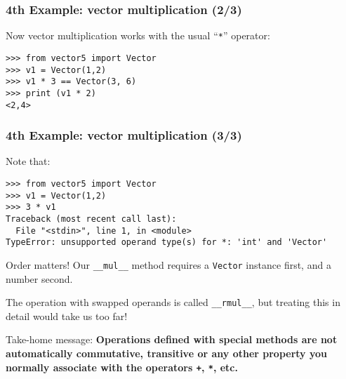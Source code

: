 \documentclass[english,serif,mathserif,xcolor=pdftex,dvipsnames,table]{beamer}
\begin{document}
\begin{frame}[fragile]
  \frametitle{4th Example: vector multiplication (2/3)}
  Now vector multiplication works with the usual ``\texttt{*}'' operator:
\begin{lstlisting}
>>> from vector5 import Vector
>>> v1 = Vector(1,2)
>>> v1 * 3 == Vector(3, 6)
>>> print (v1 * 2)
<2,4>
\end{lstlisting}
\end{frame}


\begin{frame}[fragile]
  \frametitle{4th Example: vector multiplication (3/3)}
  \small

  Note that:
\begin{lstlisting}[basicstyle=\ttfamily\scriptsize]
>>> from vector5 import Vector
>>> v1 = Vector(1,2)
>>> 3 * v1
Traceback (most recent call last):
  File "<stdin>", line 1, in <module>
TypeError: unsupported operand type(s) for *: 'int' and 'Vector'
\end{lstlisting}

  \+ Order matters! Our \lstinline|__mul__| method requires a \lstinline|Vector| instance first, and a number second.

  \+ The operation with swapped operands is called \lstinline|__rmul__|, but treating this in detail would take us too far!

  \+ Take-home message: \textbf{Operations defined with special
    methods are not automatically commutative, transitive or any other
    property you normally associate with the operators \texttt{+},
    \texttt{*}, etc.}
\end{frame}
\end{document}
